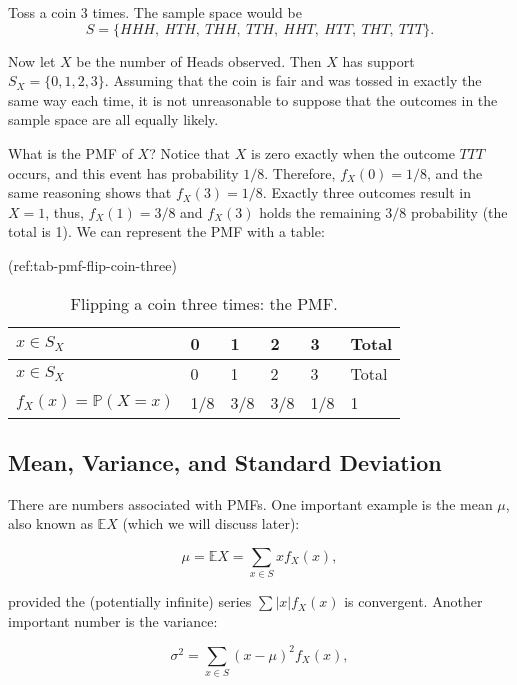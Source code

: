 \documentclass[]{book}
\numberwithin{equation}{chapter}
\numberwithin{figure}{chapter}
\theoremstyle{plain}
\theoremstyle{definition}
\theoremstyle{remark}
\theoremstyle{definition}
\theoremstyle{definition}
\theoremstyle{remark}
\let\BeginKnitrBlock\begin \let\EndKnitrBlock\end
\begin{document}
\bigskip

\BeginKnitrBlock{example}
\protect\hypertarget{ex:toss-a-coin}{}{\label{ex:toss-a-coin}}Toss a coin 3
times. The sample space would be \[
S=\{ HHH,\ HTH,\ THH,\ TTH,\ HHT,\ HTT,\ THT,\ TTT\}.  \]
\EndKnitrBlock{example}

Now let \(X\) be the number of Heads observed. Then \(X\) has support
\(S_{X}=\{ 0,1,2,3\}\). Assuming that the coin is fair and was tossed in
exactly the same way each time, it is not unreasonable to suppose that
the outcomes in the sample space are all equally likely.

What is the PMF of \(X\)? Notice that \(X\) is zero exactly when the
outcome \(TTT\) occurs, and this event has probability \(1/8\).
Therefore, \(f_{X}(0)=1/8\), and the same reasoning shows that
\(f_{X}(3)=1/8\). Exactly three outcomes result in \(X=1\), thus,
\(f_{X}(1)=3/8\) and \(f_{X}(3)\) holds the remaining \(3/8\)
probability (the total is 1). We can represent the PMF with a table:

(ref:tab-pmf-flip-coin-three)

\begin{longtable}[]{@{}llllll@{}}
\caption{Flipping a coin three times: the PMF.}\tabularnewline
\toprule
\(x\in S_{X}\) & 0 & 1 & 2 & 3 & Total\tabularnewline
\midrule
\endfirsthead
\toprule
\(x\in S_{X}\) & 0 & 1 & 2 & 3 & Total\tabularnewline
\midrule
\endhead
\(f_{X}(x)=\mathbb{P}(X=x)\) & 1/8 & 3/8 & 3/8 & 1/8 & 1\tabularnewline
\bottomrule
\end{longtable}

\subsection{Mean, Variance, and Standard
Deviation}\label{sub-mean-variance-sd}

There are numbers associated with PMFs. One important example is the
mean \(\mu\), also known as \(\mathbb{E} X\) (which we will discuss
later):

\begin{equation}
\mu=\mathbb{E} X=\sum_{x\in S}xf_{X}(x),
\end{equation}

provided the (potentially infinite) series \(\sum|x|f_{X}(x)\) is
convergent. Another important number is the variance:

\begin{equation}
\sigma^{2}=\sum_{x\in S}(x-\mu)^{2}f_{X}(x),
\end{equation}
\end{document}
